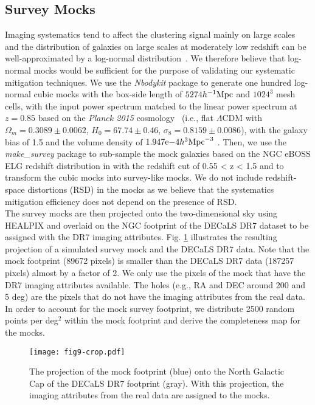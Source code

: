 \documentclass[fleqn, usenatbib]{mnras}
\def\ihMpc{h^{-1}{\rm Mpc}}
\def\trihMpc{h^{3}{\rm Mpc}^{-3}}
\begin{document}
\subsection{Survey Mocks}\label{subsec:surveymocks}
Imaging systematics tend to affect the clustering signal mainly on large scales \citep{myers2007clustering, huterer2013calibration} and the distribution of galaxies on large scales at moderately low redshift can be well-approximated by a log-normal distribution~\citep{1991MNRAS.248....1C}. We therefore believe that log-normal mocks would be sufficient for the purpose of validating our systematic mitigation techniques. We use the \textit{Nbodykit} package \citep{hand2017nbodykit} to generate one hundred log-normal cubic mocks with the box-side length of $5274 \ihMpc$ and $1024^3$ mesh cells, with the input power spectrum matched to the linear power spectrum  at $z=0.85$ based on the \textit{Planck 2015} cosmology~\citep{ade2016planck} (i.e., flat $\Lambda$CDM with $\Omega_m=0.3089 \pm 0.0062$, $H_{0}=67.74 \pm 0.46$, $\sigma_8 = 0.8159 \pm 0.0086$), with the galaxy bias of 1.5 and the volume density of $1.947\mathrm{e}{-4}\trihMpc$ \citep[see e.g.][]{Raichoor2017MNRAS.471.3955R}. Then, we use the \textit{make\_survey} package \citep{white2013mock} to sub-sample the mock galaxies based on the NGC eBOSS ELG redshift distribution in \citet{Raichoor2017MNRAS.471.3955R} with the redshift cut of  0.55 < z < 1.5 and to transform the cubic mocks into survey-like mocks. We do not include redshift-space distortions (RSD) in the mocks as we believe that the systematics mitigation efficiency does not depend on  the presence of RSD.\\

The survey mocks are then projected onto the two-dimensional sky using HEALPIX and overlaid on the NGC footprint of the DECaLS DR7 dataset to be assigned with the DR7 imaging attributes. Fig. \ref{fig:mock_on_dr} illustrates the resulting projection of a simulated survey mock and the DECaLS DR7 data. Note that the mock footprint (89672 pixels) is smaller than the DECaLS DR7 data (187257 pixels) almost by a factor of 2. We only use the pixels of the mock that have the DR7 imaging attributes available. The holes (e.g., RA and DEC around 200 and 5 deg) are the pixels that do not have the imaging attributes from the real data. In order to account for the mock survey footprint, we distribute 2500 random points per deg$^{2}$ within the mock footprint and derive the completeness map for the mocks.


\begin{figure}
    \centering
    \texttt{[image: fig9-crop.pdf]}
    \caption{The projection of the mock footprint (blue) onto the North Galactic Cap of the DECaLS DR7 footprint (gray). With this projection, the imaging attributes from the real data are assigned to the mocks.}
    \label{fig:mock_on_dr}
\end{figure}
\end{document}
